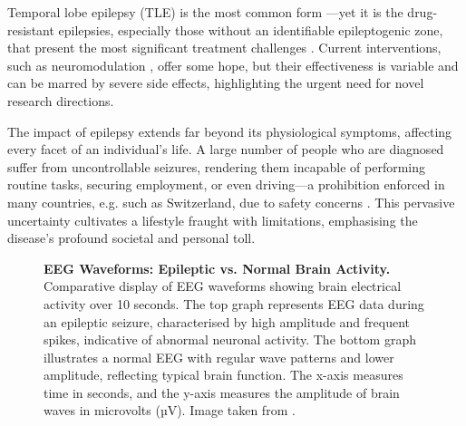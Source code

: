 \documentclass[10pt]{article}
\begin{document}
\begin{sloppypar}
  Temporal lobe epilepsy (TLE) is the most common form \citep{epilepsy_foundation_temporal_2019}—yet it is the drug-resistant epilepsies, especially those without an identifiable epileptogenic zone, that present the most significant treatment challenges \citep{iwasaki_non-invasive_2016, guery_clinical_2021}. Current interventions, such as neuromodulation \citep{fisher_electrical_2014}, offer some hope, but their effectiveness is variable and can be marred by severe side effects, highlighting the urgent need for novel research directions.

  The impact of epilepsy extends far beyond its physiological symptoms, affecting every facet of an individual’s life. A large number of people who are diagnosed suffer from uncontrollable seizures, rendering them incapable of performing routine tasks, securing employment, or even driving—a prohibition enforced in many countries, e.g. such as Switzerland, due to safety concerns \citep{schweizerische_epilepsieliga_driving_2021}. This pervasive uncertainty cultivates a lifestyle fraught with limitations, emphasising the disease’s profound societal and personal toll.

  \begin{figure}[ht]
    \centering
    \caption[EEG Waveforms: Epileptic vs. Normal Brain Activity]{\textbf{EEG Waveforms: Epileptic vs. Normal Brain Activity.} Comparative display of EEG waveforms showing brain electrical activity over 10 seconds. The top graph represents EEG data during an epileptic seizure, characterised by high amplitude and frequent spikes, indicative of abnormal neuronal activity. The bottom graph illustrates a normal EEG with regular wave patterns and lower amplitude, reflecting typical brain function. The x-axis measures time in seconds, and the y-axis measures the amplitude of brain waves in microvolts (µV). Image taken from \cite{espinosa_feedforward_2020}.}
    \label{fig:seizure-eeg}
  \end{figure}


\end{sloppypar}
\end{document}
